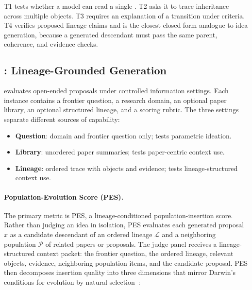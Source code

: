 T1 tests whether a model can read a single \genome{}. T2 asks it to trace inheritance across multiple \genome{} objects. T3 requires an explanation of a transition under \genomediff{} criteria. T4 verifies proposed lineage claims and is the closest closed-form analogue to idea generation, because a generated descendant must pass the same parent, coherence, and evidence checks.

\subsection{\genearena{}: Lineage-Grounded Generation}
\label{sec:gene_arena}

\genearena{} evaluates open-ended proposals under controlled information settings. Each instance contains a frontier question, a research domain, an optional paper library, an optional structured lineage, and a scoring rubric. The three settings separate different sources of capability:
\begin{itemize}[noitemsep,topsep=2pt,leftmargin=1.2em]
\item \textbf{Question}: domain and frontier question only; tests parametric ideation.
\item \textbf{Library}: unordered paper summaries; tests paper-centric context use.
\item \textbf{Lineage}: ordered trace with \genome{} objects and \genomediff{} evidence; tests lineage-structured context use.
\end{itemize}

\paragraph{Population-Evolution Score (PES).}
The primary metric is PES, a lineage-conditioned population-insertion score. Rather than judging an idea in isolation, PES evaluates each generated proposal $x$ as a candidate descendant of an ordered lineage $\mathcal{L}$ and a neighboring population $\mathcal{P}$ of related papers or proposals. The judge panel receives a lineage-structured context packet: the frontier question, the ordered lineage, relevant \genome{} objects, \genomediff{} evidence, neighboring population items, and the candidate proposal. PES then decomposes insertion quality into three dimensions that mirror Darwin's conditions for evolution by natural selection~\citep{darwin1859}:

